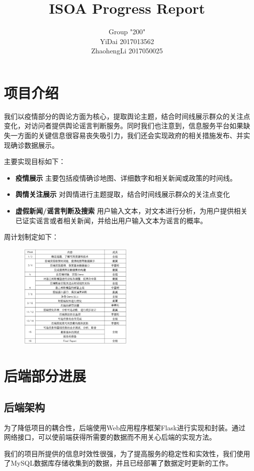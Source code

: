 \documentclass{article}
\title{ISOA Progress Report}
\author{Group "200"\\YiDai 2017013562\\ZhaohengLi 2017050025}
\begin{document}
\maketitle
\section{项目介绍}
我们以疫情部分的舆论方面为核心，提取舆论主题，结合时间线展示群众的关注点变化，对访问者提供舆论谣言判断服务。同时我们也注意到，信息服务平台如果缺失一方面的关键信息很容易丧失吸引力，我们还会实现政府的相关措施发布、并实现确诊数据展示。

主要实现目标如下：
\begin{itemize}
	\item{\textbf{疫情展示}} 主要包括疫情确诊地图、详细数字和相关新闻或政策的时间线。
	\item{\textbf{舆情关注展示}} 对舆情进行主题提取，结合时间线展示群众的关注点变化
	\item{\textbf{虚假新闻/谣言判断及搜索}} 用户输入文本，对文本进行分析，为用户提供相关已证实谣言或者相关新闻，并给出用户输入文本为谣言的概率。
\end{itemize}

周计划制定如下：
\begin{figure}[htb]
\centering
\includegraphics[width=0.5\textwidth]{pic1.png}
\end{figure}

\section{后端部分进展}
\subsection{后端架构}
为了降低项目的耦合性，后端使用Web应用程序框架Flask进行实现和封装。通过网络接口，可以使前端获得所需要的数据而不用关心后端的实现方法。

我们的项目所提供的信息时效性很强，为了提高服务的稳定性和实效性，我们使用了MySQL数据库存储收集到的数据，并且已经部署了数据定时更新的工作。
\end{document}

